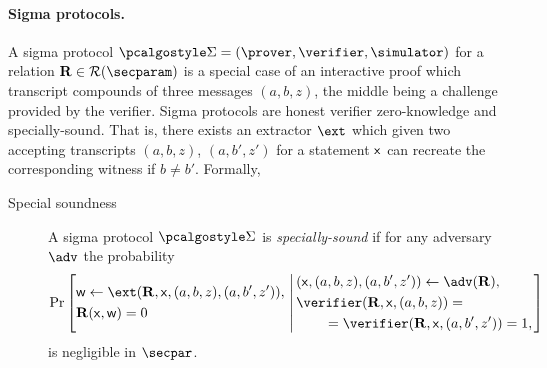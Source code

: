 \let\accentvec\vec \documentclass[runningheads,10pt]{llncs}
\begin{document}
\paragraph{Sigma protocols.}
A sigma protocol $\sigmaprot = (\prover, \verifier, \simulator)$  for a relation
$\REL \in \RELGEN(\secparam)$  is a special case of an interactive proof which transcript compounds of three messages $(a, b, z)$, the middle being a challenge provided by the verifier.
Sigma protocols are honest verifier zero-knowledge and specially-sound. That
is, there exists an extractor $\ext$ which given two accepting transcripts $(a, b, z)$, $(a, b', z')$ for a statement $\mathsf{x}$ can recreate the corresponding witness if $b \neq b'$. Formally,
\begin{description}
	\item[Special soundness] A sigma protocol $\sigmaprot$ is \emph{specially-sound} if for any adversary $\adv$ the probability
	\[
		\Pr\left[
		\begin{aligned}
				& \wit \gets \ext(\REL, \inp, (a, b, z), (a, b', z')),\\
				& \REL(\inp, \wit) = 0
		\end{aligned}
		\,\left|\,
		\begin{aligned}
			& (\inp, (a, b, z), (a, b', z')) \gets \adv(\REL), \\
			& \verifier(\REL, \inp, (a, b, z)) = \\
			& \qquad = \verifier(\REL, \inp, (a, b', z')) = 1, \\
		\end{aligned}
		\right.\right]
	\]
	is negligible in $\secpar$.
\end{description}

\end{document}
